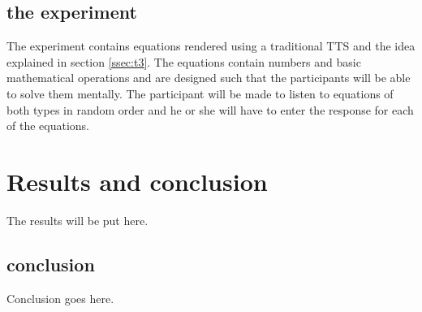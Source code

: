 \documentclass{article}
\begin{document}
\subsection{the experiment}
\label{comprehension_exp}

The experiment contains equations rendered using a traditional TTS and the idea explained in section \ref{ssec:t3}.
The equations contain numbers and basic mathematical operations and are designed such that the participants will be able to solve them mentally. The participant will be made to listen to equations of both  types in random order and he or she will have to enter the response for each of the equations.
\section{Results and conclusion}
\label{results}

The results will be put here.
\subsection{conclusion}
\label{ssec:conclusion}
Conclusion goes here.%


\end{document}

